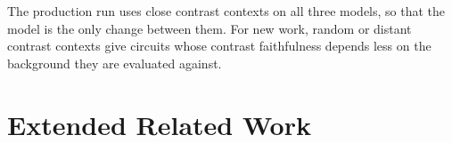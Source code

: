 \documentclass[10pt]{article}
\begin{document}
The production run uses close contrast contexts on all three models, so that the model is the only change between them.
For new work, random or distant contrast contexts give circuits whose contrast faithfulness depends less on the background they are evaluated against.

\FloatBarrier
{}

\section{Extended Related Work}
\label{app:related}
\end{document}
